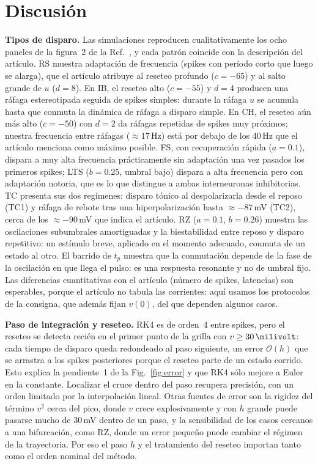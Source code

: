 \documentclass[10pt,a4paper,twocolumn]{article}
\begin{document}
\section{Discusión}
\textbf{Tipos de disparo.} Las simulaciones reproducen cualitativamente los ocho
paneles de la figura~2 de la Ref.~\cite{izhikevich2003}, y cada patrón coincide con la
descripción del artículo. RS muestra adaptación de frecuencia (spikes con período corto
que luego se alarga), que el artículo atribuye al reseteo profundo ($c=-65$) y al salto
grande de $u$ ($d=8$). En IB, el reseteo alto ($c=-55$) y $d=4$ producen una ráfaga
estereotipada seguida de spikes simples: durante la ráfaga $u$ se acumula hasta que
conmuta la dinámica de ráfaga a disparo simple. En CH, el reseteo aún más alto
($c=-50$) con $d=2$ da ráfagas repetidas de spikes muy próximos; nuestra frecuencia
entre ráfagas ($\approx17$\,Hz) está por debajo de los 40\,Hz que el artículo menciona
como máximo posible. FS, con recuperación rápida ($a=\num{0.1}$), dispara a muy alta
frecuencia prácticamente sin adaptación una vez pasados los primeros spikes; LTS
($b=\num{0.25}$, umbral bajo) dispara a alta frecuencia pero con adaptación notoria,
que es lo que distingue a ambas interneuronas inhibitorias. TC presenta sus dos
regímenes: disparo tónico al despolarizarla desde el reposo (TC1) y ráfaga de rebote
tras una hiperpolarización hasta $\approx-87$\,mV (TC2), cerca de los $\approx-90$\,mV
que indica el artículo. RZ ($a=\num{0.1}$, $b=\num{0.26}$) muestra las oscilaciones
subumbrales amortiguadas y la biestabilidad entre reposo y disparo repetitivo: un
estímulo breve, aplicado en el momento adecuado, conmuta de un estado al otro. El
barrido de $t_p$ muestra que la conmutación depende de la fase de la oscilación en que
llega el pulso: es una respuesta resonante y no de umbral fijo. Las diferencias
cuantitativas con el artículo (número de spikes, latencias) son esperables, porque el
artículo no tabula las corrientes: aquí usamos los protocolos de la consigna, que
además fijan $v(0)$, del que dependen algunos casos.

\textbf{Paso de integración y reseteo.} RK4 es de orden~4 entre spikes, pero el reseteo
se detecta recién en el primer punto de la grilla con $v\geq\SI{30}{\milivolt}$: cada
tiempo de disparo queda redondeado al paso siguiente, un error $\mathcal O(h)$ que se
arrastra a los spikes posteriores porque el reseteo parte de un estado corrido. Esto
explica la pendiente~1 de la Fig.~\ref{fig:error} y que RK4 sólo mejore a Euler en la
constante. Localizar el cruce dentro del paso recupera precisión, con un orden
limitado por la interpolación lineal. Otras fuentes de error son la rigidez del
término $v^2$ cerca del pico, donde $v$ crece explosivamente y con $h$ grande puede
pasarse mucho de 30\,mV dentro de un paso, y la sensibilidad de los casos cercanos a
una bifurcación, como RZ, donde un error pequeño puede cambiar el régimen de la
trayectoria. Por eso el paso $h$ y el tratamiento del reseteo importan tanto como el
orden nominal del método.
\end{document}
